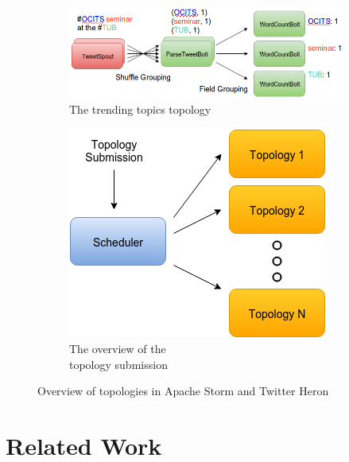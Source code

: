 \documentclass[conference]{IEEEtran}
\begin{document}
\begin{figure}[!h]
\centering
	\begin{subfigure}{1.35\columnwidth}
		\includegraphics[width=\columnwidth]{figures/TopologyWordCount}
		\caption{The trending topics topology}
		\label{fig:TopologyTrendingTopics}
	\end{subfigure}\hspace{2.9em}
	\begin{subfigure}{.55\columnwidth}
		\includegraphics[width=\columnwidth]{figures/TopologySubmission}
		\caption{The overview of the \\topology submission}
		\label{fig:TopologySubmission}
	\end{subfigure}\hfill
\label{TopologyDescription}
\caption{Overview of topologies in Apache Storm and Twitter Heron}
\end{figure}

\section{Related Work}
\label{sec:RelatedWork}
\end{document}
